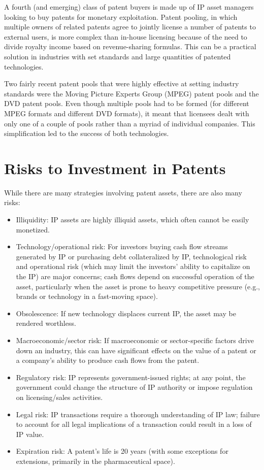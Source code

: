\documentclass[11pt]{article}
\begin{document}
A fourth (and emerging) class of patent buyers is made up of IP asset managers looking to buy patents for monetary exploitation. Patent pooling, in which multiple owners of related patents agree to jointly license a number of patents to external users, is more complex than in-house licensing because of the need to divide royalty income based on revenue-sharing formulas. This can be a practical solution in industries with set standards and large quantities of patented technologies.

Two fairly recent patent pools that were highly effective at setting industry standards were the Moving Picture Experts Group (MPEG) patent pools and the DVD patent pools. Even though multiple pools had to be formed (for different MPEG formats and different DVD formats), it meant that licensees dealt with only one of a couple of pools rather than a myriad of individual companies. This simplification led to the success of both technologies.

\section*{Risks to Investment in Patents}
While there are many strategies involving patent assets, there are also many risks:

\begin{itemize}
  \item Illiquidity: IP assets are highly illiquid assets, which often cannot be easily monetized.
  \item Technology/operational risk: For investors buying cash flow streams generated by IP or purchasing debt collateralized by IP, technological risk and operational risk (which may limit the investors' ability to capitalize on the IP) are major concerns; cash flows depend on successful operation of the asset, particularly when the asset is prone to heavy competitive pressure (e.g., brands or technology in a fast-moving space).
  \item Obsolescence: If new technology displaces current IP, the asset may be rendered worthless.
  \item Macroeconomic/sector risk: If macroeconomic or sector-specific factors drive down an industry, this can have significant effects on the value of a patent or a company's ability to produce cash flows from the patent.
  \item Regulatory risk: IP represents government-issued rights; at any point, the government could change the structure of IP authority or impose regulation on licensing/sales activities.
  \item Legal risk: IP transactions require a thorough understanding of IP law; failure to account for all legal implications of a transaction could result in a loss of IP value.
  \item Expiration risk: A patent's life is 20 years (with some exceptions for extensions, primarily in the pharmaceutical space).
\end{itemize}
\end{document}
